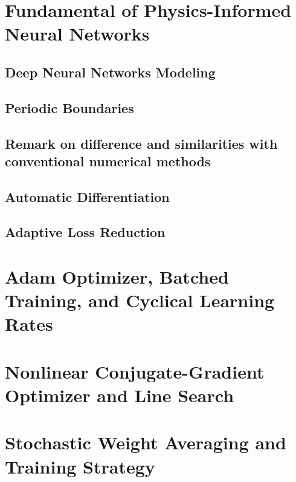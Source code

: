 \documentclass[font=Times]{gw-dissertation}[2021/11/19]
\begin{document}
    \section{Fundamental of Physics-Informed Neural Networks}

        \subsection{Deep Neural Networks Modeling}
        

        \subsection{Periodic Boundaries}\label{section:periodic-boundary}

        \subsection{Remark on difference and similarities with conventional numerical methods}
        

        \subsection{Automatic Differentiation}
        

        \subsection{Adaptive Loss Reduction}\label{section:loss-annealing}
        

    \section{Adam Optimizer, Batched Training, and Cyclical Learning Rates}\label{section:adam}

    \section{Nonlinear Conjugate-Gradient Optimizer and Line Search}

    \section{Stochastic Weight Averaging and Training Strategy}
\end{document}
